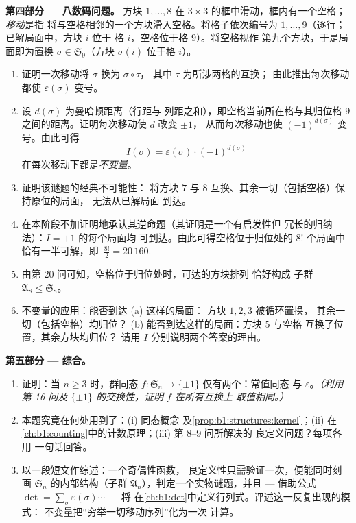 \begin{problem}
\medskip
\noindent\textbf{第四部分 --- 八数码问题。} 方块 $1, \dots, 8$ 在
$3 \times 3$ 的框中滑动，框内有一个空格；\emph{移动}是指
将与空格相邻的一个方块滑入空格。将格子依次编号为
$1, \dots, 9$（逐行；已解局面中，方块 $i$ 位于
格 $i$，空格位于格 $9$）。将空格视作
第九个方块，于是局面即为置换 $\sigma \in \mathfrak
S_9$（方块 $\sigma(i)$ 位于格 $i$）。
\begin{enumerate}[resume]
  \item 证明一次移动将 $\sigma$ 换为 $\sigma \circ \tau$，
        其中 $\tau$ 为所涉两格的互换；
        由此推出每次移动都使
        $\varepsilon(\sigma)$ 变号。
  \item 设 $d(\sigma)$ 为曼哈顿距离（行距与
        列距之和），即空格当前所在格与其归位格
        $9$ 之间的距离。证明每次移动使 $d$ 改变 $\pm1$，
        从而每次移动也使 $(-1)^{d(\sigma)}$ 变号。由此可得
        \[
        I(\sigma) = \varepsilon(\sigma)\cdot(-1)^{d(\sigma)}
        \]
        在每次移动下都是\emph{不变量}。
  \item 证明该谜题的经典不可能性：
        将方块 $7$ 与 $8$ 互换、其余一切（包括空格）保持原位的局面，
        无法从已解局面
        到达。
  \item 在本阶段不加证明地承认其逆命题（其证明是一个有启发性但
        冗长的归纳法）：$I = +1$ 的每个局面均
        可到达。由此可得空格位于归位处的 $8!$ 个局面中
        恰有一半可解，即\
        $\frac{8!}2 = 20\,160$.
  \item 由第 20 问可知，空格位于归位处时，可达的方块排列
        恰好构成
        子群 $\mathfrak A_8 \leq \mathfrak S_8$。
  \item 不变量的应用：能否到达 (a) 这样的局面：
        方块 $1, 2, 3$ 被循环置换，
        其余一切（包括空格）均归位？
        (b) 能否到达这样的局面：方块 $5$ 与空格
        互换了位置，其余方块均归位？
        请用 $I$ 分别说明两个答案的理由。
\end{enumerate}

\medskip
\noindent\textbf{第五部分 --- 综合。}
\begin{enumerate}[resume]
  \item 证明：当 $n \geq 3$ 时，群同态 $f
        \colon \mathfrak S_n \to \{\pm 1\}$ 仅有两个：常值同态
        与 $\varepsilon$。\emph{（利用第 16 问及
        $\{\pm1\}$ 的交换性，证明 $f$ 在所有互换上
        取值相同。）}
  \item 本题究竟在何处用到了：(i) 同态概念
        及\cref{prop:b1:structures:kernel}；(ii) 在
        \cref{ch:b1:counting}中的计数原理；(iii) 第 8--9 问所解决的
        良定义问题？每项各用
        一句话回答。
  \item 以一段短文作综述：一个奇偶性函数，
        良定义性只需验证一次，便能同时刻画
        $\mathfrak S_n$ 的内部结构（子群
        $\mathfrak A_n$），判定一个实物谜题，并且 ---
        借助公式 $\det = \sum_\sigma
        \varepsilon(\sigma)\cdots$ --- 将
        在\cref{ch:b1:det}中定义行列式。评述这一反复出现的模式：
        不变量把“穷举一切移动序列”化为一次
        计算。
\end{enumerate}
\end{problem}
